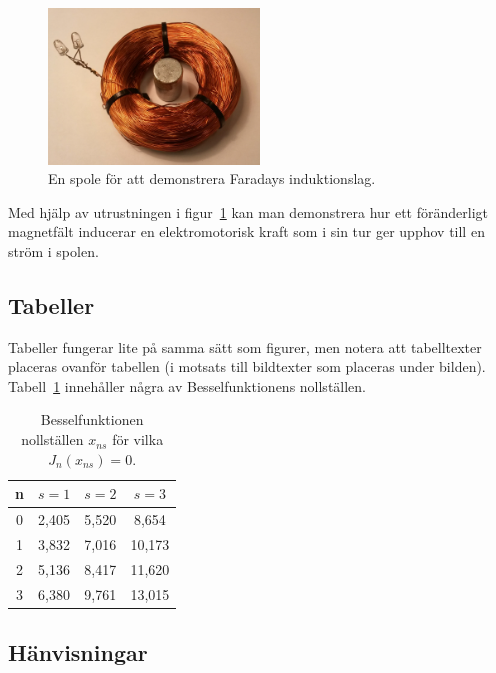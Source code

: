 \documentclass[swedish, 12pt, a4paper, elec, utf8, a-2b, online]{aaltothesis}
\begin{document}
\begin{figure}[t]
  \centering
  \includegraphics[width=0.5\textwidth]{ledspole.jpg}
  \caption{En spole för att demonstrera Faradays induktionslag.}
  \label{fig:spole}
\end{figure}

Med hjälp av utrustningen i figur~\ref{fig:spole} kan man demonstrera hur
ett föränderligt magnetfält inducerar en elektromotorisk kraft som i sin
tur ger upphov till en ström i spolen.

\subsection{Tabeller}
\label{sec:tabeller}

Tabeller fungerar lite på samma sätt som figurer, men notera att
tabelltexter placeras ovanför tabellen (i motsats till bildtexter som
placeras under bilden). Tabell~\ref{tab:bessel} innehåller några av
Besselfunktionens nollställen.

\begin{table}[t]
  \caption{Besselfunktionen nollställen $x_{ns}$
    för vilka $J_n(x_{ns})=0$.} 
  \label{tab:bessel}
  \begin{center}
    \begin{tabular}{c|ccc}
      n & $s=1$ & $s=2$ & $s=3$\\
      \hline
      0 & 2,405 & 5,520 & \phantom{0}8,654\\
      1 & 3,832 & 7,016 & 10,173\\
      2 & 5,136 & 8,417 & 11,620\\
      3 & 6,380 & 9,761 & 13,015
    \end{tabular}
  \end{center}
\end{table}

\subsection{Hänvisningar}
\end{document}
